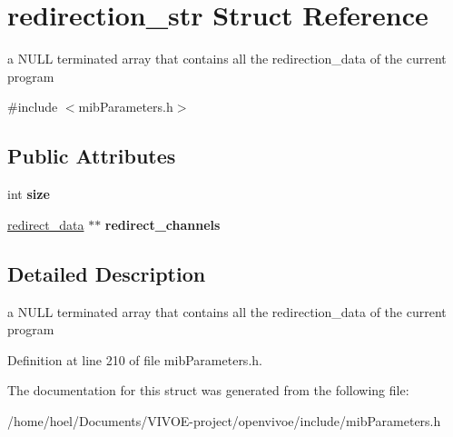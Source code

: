 \hypertarget{structredirection__str}{}\section{redirection\+\_\+str Struct Reference}
\label{structredirection__str}


a N\+U\+LL terminated array that contains all the redirection\+\_\+data of the current program  




{\ttfamily \#include $<$mib\+Parameters.\+h$>$}

\subsection*{Public Attributes}
\begin{DoxyCompactItemize}
\item 
int {\bfseries size}\hypertarget{structredirection__str_a4c5963491c56a1c84026a0ba2a8e23e3}{}\label{structredirection__str_a4c5963491c56a1c84026a0ba2a8e23e3}

\item 
\hyperlink{structredirect__data}{redirect\+\_\+data} $\ast$$\ast$ {\bfseries redirect\+\_\+channels}\hypertarget{structredirection__str_ad9e0feadc5f9d1563a4b24ff04930735}{}\label{structredirection__str_ad9e0feadc5f9d1563a4b24ff04930735}

\end{DoxyCompactItemize}


\subsection{Detailed Description}
a N\+U\+LL terminated array that contains all the redirection\+\_\+data of the current program 

Definition at line 210 of file mib\+Parameters.\+h.



The documentation for this struct was generated from the following file\+:\begin{DoxyCompactItemize}
\item 
/home/hoel/\+Documents/\+V\+I\+V\+O\+E-\/project/openvivoe/include/mib\+Parameters.\+h\end{DoxyCompactItemize}
